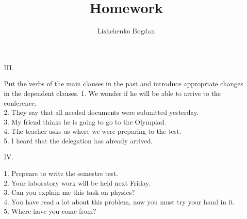 \documentclass[a4paper,14pt]{extreport}
\title{Homework}
\author{Lishchenko Bogdan}
\begin{document}
\maketitle




    \begin{center}      III.    \end{center}   
    Put the verbs of the main clauses in the past and introduce appropriate changes in the dependent clauses.
    1. We wonder if he will be able to arrive to the conference. \\
    2. They say that all needed documents were submitted yesterday. \\
    3. My friend thinks he is going to go to the Olympiad. \\
    4. The teacher asks us where we were preparing to the test. \\
    5. I heard that the delegation has already arrived.\\

    \begin{center}      IV.    \end{center} 
    1. Prepeare to write the semestre test.\\
    2. Your laboratory work will be held next Friday.\\
    3. Can you explain me this task on physics?\\
    4. You have read a lot about this problem, now you must try your hand in it.\\
    5. Where have you come from?\\
    
    
    
    
    
    
    
    
    
    
    
    
    
    
    
    
    
    
    
    
    
\end{document}
